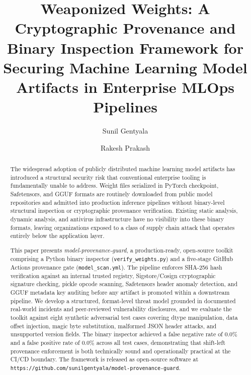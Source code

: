 \documentclass[preprint,12pt,twocolumn]{elsarticle}
\begin{document}
\begin{frontmatter}

\title{Weaponized Weights: A Cryptographic Provenance and Binary Inspection
  Framework for Securing Machine Learning Model Artifacts in Enterprise
  MLOps Pipelines}

\author[hcl]{Sunil Gentyala}

\author[cu]{Rakesh Prakash}



\begin{abstract}
The widespread adoption of publicly distributed machine learning model
artifacts has introduced a structural security risk that conventional
enterprise tooling is fundamentally unable to address. Weight files
serialized in PyTorch checkpoint, Safetensors, and GGUF formats are
routinely downloaded from public model repositories and admitted into
production inference pipelines without binary-level structural inspection
or cryptographic provenance verification. Existing static analysis,
dynamic analysis, and antivirus infrastructure have no visibility into
these binary formats, leaving organizations exposed to a class of supply
chain attack that operates entirely below the application layer.

This paper presents \textit{model-provenance-guard}, a production-ready,
open-source toolkit comprising a Python binary inspector
(\texttt{verify\_weights.py}) and a five-stage GitHub Actions provenance
gate (\texttt{model\_scan.yml}). The pipeline enforces SHA-256 hash
verification against an internal trusted registry, Sigstore/Cosign
cryptographic signature checking, pickle opcode scanning, Safetensors
header anomaly detection, and GGUF metadata key auditing before any
artifact is promoted within a downstream pipeline. We develop a structured,
format-level threat model grounded in documented real-world incidents and
peer-reviewed vulnerability disclosures, and we evaluate the toolkit against
eight synthetic adversarial test cases covering dtype manipulation, data
offset injection, magic byte substitution, malformed JSON header attacks,
and unsupported version fields. The binary inspector achieved a false
negative rate of 0.0\% and a false positive rate of 0.0\% across all
test cases, demonstrating that shift-left provenance enforcement is both
technically sound and operationally practical at the CI/CD boundary. The
framework is released as open-source software at
\texttt{https://github.com/sunilgentyala/model-provenance-guard}.
\end{abstract}


\end{frontmatter}
\end{document}
